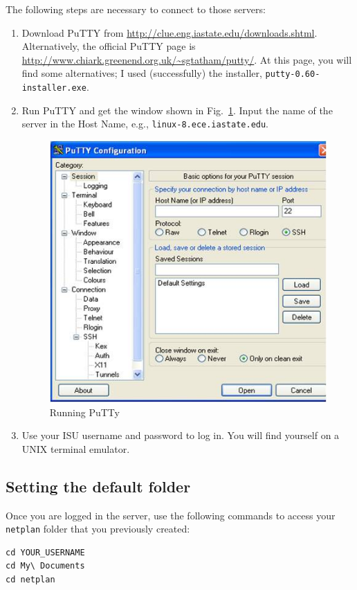 \documentclass{article}
\begin{document}
The following steps are necessary to connect to those servers:
\begin{enumerate}
  \item Download PuTTY from \url{http://clue.eng.iastate.edu/downloads.shtml}. Alternatively, the official PuTTY page is \url{http://www.chiark.greenend.org.uk/~sgtatham/putty/}. At this page, you will find some alternatives; I used (successfully) the installer, \verb=putty-0.60-installer.exe=.

  \item Run PuTTY and get the window shown in Fig.~\ref{fig:putty}. Input the name of the server in the Host Name, e.g., \verb=linux-8.ece.iastate.edu=.
\begin{figure}[ht]
\begin{center}
\includegraphics{figs/putty}
\end{center}
\caption{Running PuTTy}
\label{fig:putty}
\end{figure}

  \item Use your ISU username and password to log in. You will find yourself on a UNIX terminal emulator.
\end{enumerate}


\subsection{Setting the default folder}

Once you are logged in the server, use the following commands to access your \verb=netplan= folder that you previously created:
\begin{verbatim}
cd YOUR_USERNAME
cd My\ Documents
cd netplan
\end{verbatim}
\end{document}

